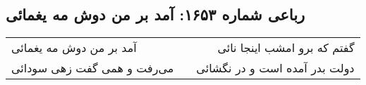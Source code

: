 \begin{center}
\section*{رباعی شماره ۱۶۵۳: آمد بر من دوش مه یغمائی}
\label{sec:1653}
\begin{longtable}{l p{0.5cm} r}
آمد بر من دوش مه یغمائی
&&
گفتم که برو امشب اینجا نائی
\\
می‌رفت و همی گفت زهی سودائی
&&
دولت بدر آمده است و در نگشائی
\\
\end{longtable}
\end{center}
